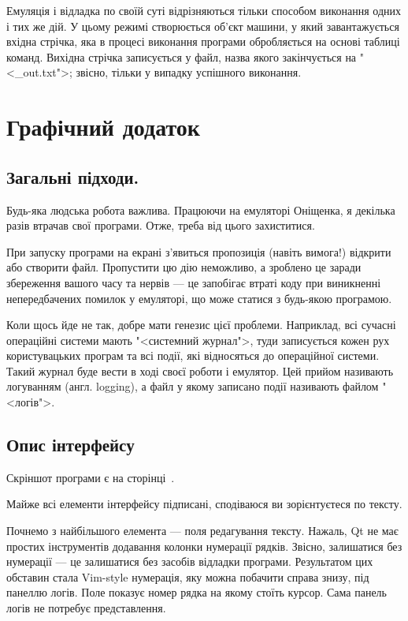 \documentclass[oneside,final,14pt]{extreport}
\begin{document}
Емуляція і відладка по своїй суті відрізняються тільки способом виконання одних і тих же дій. У цьому режимі створюється об'єкт машини, у який завантажується вхідна стрічка, яка в процесі виконання програми обробляється на основі таблиці команд. Вихідна стрічка записується у файл, назва якого закінчується на "<\_out.txt">; звісно, тільки у випадку успішного виконання.

\chapter{Графічний додаток}


\section{Загальні підходи.}
Будь-яка людська робота важлива. Працюючи на емуляторі Оніщенка, я декілька разів втрачав свої програми. Отже, треба від цього захиститися.
		
При запуску програми на екрані з'явиться пропозиція (навіть вимога!) відкрити або створити файл. Пропустити цю дію неможливо, а зроблено це заради збереження вашого часу та нервів --- це запобігає втраті коду при виникненні непередбачених помилок у емуляторі, що може статися з будь-якою програмою.

Коли щось йде не так, добре мати генезис цієї проблеми. Наприклад, всі сучасні операційні системи мають "<системний журнал">, туди записується кожен рух користувацьких програм та всі події, які відносяться до операційної системи. Такий журнал буде вести в ході своєї роботи і емулятор. Цей прийом називають логуванням (англ. logging), а файл у якому записано події називають файлом "<логів">.

\section{Опис інтерфейсу}
Скріншот програми є на сторінці \,\pageref{screenshot}.
\medskip

Майже всі елементи інтерфейсу підписані, сподіваюся ви зорієнтуєтеся по тексту.

Почнемо з найбільшого елемента --- поля редагування тексту. Нажаль, Qt не має простих інструментів додавання колонки нумерації рядків. Звісно, залишатися без нумерації --- це залишатися без засобів відладки програми. Результатом цих обставин стала Vim-style нумерація, яку можна побачити справа знизу, під панеллю логів. Поле показує номер рядка на якому стоїть курсор. Сама панель логів не потребує представлення.
\end{document}
